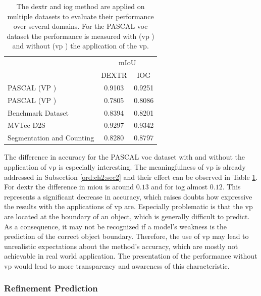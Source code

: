\begin{table}[h!]
	\centering
	\begin{tabular}{l|c c}
		\toprule 		
										& \multicolumn{2}{c}{mIoU}\\
										&  DEXTR 	& IOG		\\
		\midrule
		PASCAL (VP \cmark)				& 0.9103 	& 0.9251	\\
		PASCAL (VP \xmark)				& 0.7805	& 0.8086	\\
		Benchmark Dataset				& 0.8394 	& 0.8201	\\
		MVTec D2S						& 0.9297	& 0.9342	\\
		Segmentation and Counting		& 0.8280	& 0.8797 	\\							
		\bottomrule
	\end{tabular}
	\caption[Generalization of IOG and DEXTR]{
		The \gls{dextr} and \gls{iog} method are applied on multiple datasets to evaluate their performance over several domains.
		For the PASCAL \gls{voc} dataset the performance is measured with (\gls{vp} \cmark) and without (\gls{vp} \xmark) the application of the \gls{vp}.
	}\label{tab:ch5:tests_on_datasets}
\end{table}

The difference in accuracy for the PASCAL \gls{voc} dataset \cite{Eve20-PascalVOC} with and without the application of \gls{vp} is especially interesting.
The meaningfulness of \gls{vp} is already addressed in Subsection \ref{ord:ch2:sec2} and their effect can be observed in Table \ref{tab:ch5:tests_on_datasets}.
For \gls{dextr} the difference in \gls{miou} is around $ 0.13 $ and for \gls{iog} almost $ 0.12 $.
This represents a significant decrease in accuracy, which raises doubts how expressive the results with the applications of \gls{vp} are.
Especially problematic is that the \gls{vp} are located at the boundary of an object, which is generally difficult to predict.
As a consequence, it may not be recognized if a model's weakness is the prediction of the correct object boundary.
Therefore, the use of \gls{vp} may lead to unrealistic expectations about the method's accuracy, which are mostly not achievable in real world application.
The presentation of the performance without \gls{vp} would lead to more transparency and awareness of this characteristic.

\subsubsection{Refinement Prediction}

